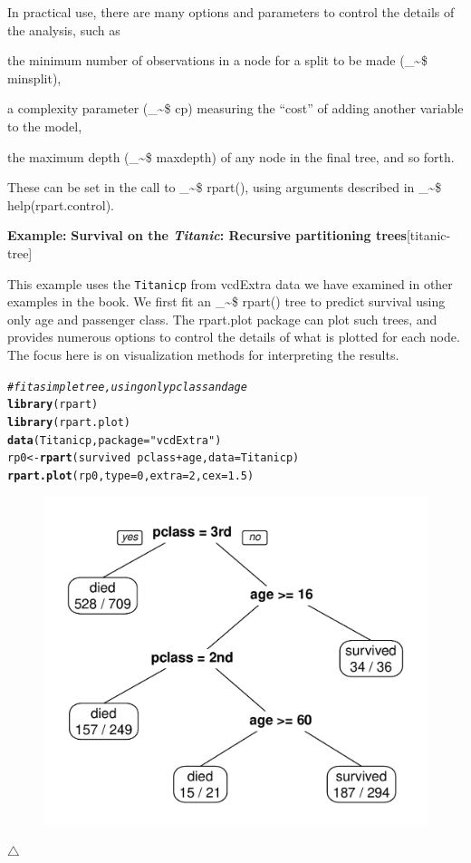 \documentclass{article}
\makeatletter
\newcommand{\hlnum}[1]{\textcolor[rgb]{0.686,0.059,0.569}{#1}}%
\newcommand{\hlstr}[1]{\textcolor[rgb]{0.192,0.494,0.8}{#1}}%
\newcommand{\hlcom}[1]{\textcolor[rgb]{0.678,0.584,0.686}{\textit{#1}}}%
\newcommand{\hlopt}[1]{\textcolor[rgb]{0,0,0}{#1}}%
\newcommand{\hlstd}[1]{\textcolor[rgb]{0.345,0.345,0.345}{#1}}%
\newcommand{\hlkwb}[1]{\textcolor[rgb]{0.69,0.353,0.396}{#1}}%
\newcommand{\hlkwc}[1]{\textcolor[rgb]{0.333,0.667,0.333}{#1}}%
\newcommand{\hlkwd}[1]{\textcolor[rgb]{0.737,0.353,0.396}{\textbf{#1}}}%
\newenvironment{kframe}{%
 \def\at@end@of@kframe{}%
 \ifinner\ifhmode%
  \def\at@end@of@kframe{\end{minipage}}%
  \begin{minipage}{\columnwidth}%
 \fi\fi%
 \def\FrameCommand##1{\hskip\@totalleftmargin \hskip-\fboxsep
 \colorbox{shadecolor}{##1}\hskip-\fboxsep
     \hskip-\linewidth \hskip-\@totalleftmargin \hskip\columnwidth}%
 \MakeFramed {\advance\hsize-\width
   \@totalleftmargin\z@ \linewidth\hsize
   \@setminipage}}%
 {\par\unskip\endMakeFramed%
 \at@end@of@kframe}
\newenvironment{knitrout}{}{} %
\newcommand{\data}[1]{\texttt{#1}}
\newcommand\code{\bgroup\@makeother\_\@makeother\~\@makeother\$\@codex}
\def\@codex#1{{\normalfont\ttfamily\hyphenchar\font=-1 #1}\egroup}
\newcommand{\func}[1]{\code{#1()}}
\newcommand{\pkg}[1]{\textsf{#1}\nocite{R-#1}}
\newcommand{\Rpackage}[1]{\pkg{#1} package}
\newenvironment{Example}[2][unnamed-example]%
  {\medskip\noindent\textbf{\textsf{Example:}}
   \textbf{#2}\hfill [#1]\par\smallskip
  }
  {\hfill $\triangle$}
\makeatother
\begin{document}
In practical use, there are many options and parameters to control the details of the analysis, such as 
\begin{itemize*}
  \item the minimum number of observations in a node for a split to be made (\code{minsplit}), 
  \item a complexity parameter (\code{cp}) measuring the ``cost'' of adding another variable to the model, 
  \item the maximum depth (\code{maxdepth}) of any node in the final tree, and so forth. 
\end{itemize*}
These can be set in the call to \func{rpart}, using arguments described in \code{help(rpart.control)}. 

\begin{Example}[titanic-tree]{Survival on the \emph{Titanic}: Recursive partitioning trees}

This example uses the \data{Titanicp} from \pkg{vcdExtra} data we have examined in other examples in the book.
We first fit an \func{rpart} tree to predict survival using only age and passenger class.
The \Rpackage{rpart.plot} can plot such trees, and provides numerous options to 
control the details of what is plotted for each node.  
The focus here is on visualization methods for interpreting the results.

\begin{knitrout}
\color{fgcolor}\begin{kframe}
\begin{alltt}
\hlcom{# fit a simple tree, using only pclass and age}
\hlkwd{library}\hlstd{(rpart)}
\hlkwd{library}\hlstd{(rpart.plot)}
\hlkwd{data}\hlstd{(Titanicp,} \hlkwc{package}\hlstd{=}\hlstr{"vcdExtra"}\hlstd{)}
\hlstd{rp0} \hlkwb{<-} \hlkwd{rpart}\hlstd{(survived} \hlopt{~} \hlstd{pclass} \hlopt{+} \hlstd{age,} \hlkwc{data}\hlstd{=Titanicp)}
\hlkwd{rpart.plot}\hlstd{(rp0,} \hlkwc{type}\hlstd{=}\hlnum{0}\hlstd{,} \hlkwc{extra}\hlstd{=}\hlnum{2}\hlstd{,} \hlkwc{cex}\hlstd{=}\hlnum{1.5}\hlstd{)}
\end{alltt}
\end{kframe}\begin{figure}[hbt!]

{\centering \includegraphics[width=0.55\linewidth]{figure/rp0-1} 

}
\end{figure}
\end{knitrout}
\end{Example}
\end{document}
